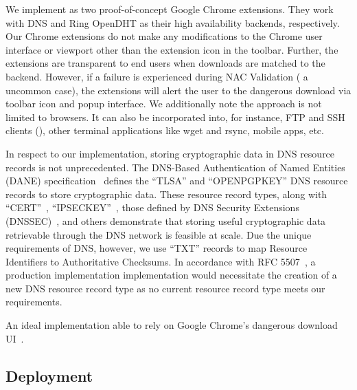 We implement \SYSTEM{} as two proof-of-concept Google Chrome extensions. They
work with DNS and Ring OpenDHT as their high availability backends,
respectively. Our Chrome extensions do not make any modifications to the Chrome
user interface or viewport other than the extension icon in the toolbar.
Further, the extensions are transparent to end users when downloads are matched
to the backend. However, if a failure is experienced during NAC Validation (\ie
a uncommon case), the extensions will alert the user to the dangerous download
via toolbar icon and popup interface. We additionally note the \SYSTEM{}
approach is not limited to browsers. It can also be incorporated into, for
instance, FTP and SSH clients (), other terminal applications like
wget and rsync, mobile apps, etc.

In respect to our implementation, storing cryptographic data in DNS resource
records is not unprecedented. The DNS-Based Authentication of Named Entities
(DANE) specification~\cite{DANE1, DANE2, DANE3} defines the ``TLSA'' and
``OPENPGPKEY'' DNS resource records to store cryptographic data. These resource
record types, along with ``CERT''~\cite{CERT}, ``IPSECKEY''~\cite{IPSECKEY},
those defined by DNS Security Extensions (DNSSEC)~\cite{DNSSEC}, and others
demonstrate that storing useful cryptographic data retrievable through the DNS
network is feasible at scale. Due the unique requirements of DNS, however, we
use ``TXT'' records to map Resource Identifiers to Authoritative Checksums. In
accordance with RFC 5507~\cite{RFC5507}, a production implementation
implementation would necessitate the creation of a new DNS resource record type
as no current resource record type meets our requirements.

An ideal implementation able to rely on Google Chrome's dangerous download
UI~\cite{ChromeClickThrough}.

\subsection{Deployment}

